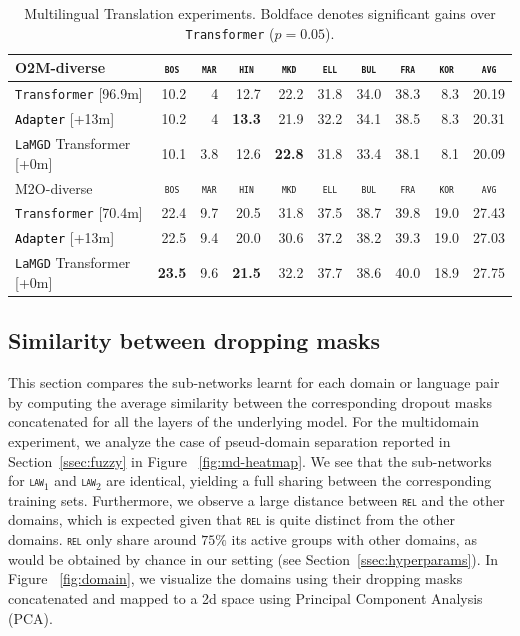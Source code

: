 \documentclass[11pt]{article}
\newcommand{\fyDone}[1]{\done[FY]\Todo[FY:]{\textcolor{orange}{#1}}}
\newcommand{\revision}[1]{\textcolor{black}{#1}}
\newcommand{\domain}[1]{\texttt{\textsc{#1}}}
\newcommand{\system}[1]{\texttt{{#1}}}
\newcommand{\SB}[1]{\textbf{#1}}
\begin{document}
\begin{table}[h!]
\begin{tabular}{|p{4cm}|*{9}{r|}}
    \hline
    \hline
    O2M-diverse & \multicolumn{1}{c|}{\domain{bos}} & \multicolumn{1}{c|}{\domain{mar}} & \multicolumn{1}{c|}{\domain{hin}} & \multicolumn{1}{c|}{\domain{mkd}} & \multicolumn{1}{c|}{\domain{ell}} & \multicolumn{1}{c|}{\domain{bul}} & \multicolumn{1}{c|}{\domain{fra}} & \multicolumn{1}{c|}{\domain{kor}} & \multicolumn{1}{c|}{\domain{avg}} \\ \hline 
    \system{Transformer}  \hfill{\footnotesize[96.9m]} & 10.2&4&12.7&22.2&31.8&34.0&38.3&8.3&20.19 \\
    \revision{\system{Adapter}}   \hfill{\footnotesize[+13m]}  &10.2&4&\SB{13.3}&21.9&32.2&34.1&38.5&8.3&20.31 \\ 
    \system{LaMGD} Transformer   \hfill{\footnotesize[+0m]}&10.1&3.8&12.6&\SB{22.8}&31.8&33.4&38.1&8.1&20.09\\
    \hline 
    \hline
    M2O-diverse & \multicolumn{1}{c|}{\domain{bos}} & \multicolumn{1}{c|}{\domain{mar}} & \multicolumn{1}{c|}{\domain{hin}} & \multicolumn{1}{c|}{\domain{mkd}} & \multicolumn{1}{c|}{\domain{ell}} & \multicolumn{1}{c|}{\domain{bul}} & \multicolumn{1}{c|}{\domain{fra}} & \multicolumn{1}{c|}{\domain{kor}} & \multicolumn{1}{c|}{\domain{avg}} \\ \hline 
    \system{Transformer}  \hfill{\footnotesize[70.4m]} &22.4&9.7&20.5&31.8&37.5&38.7&39.8&19.0&27.43 \\
    \revision{\system{Adapter}}   \hfill{\footnotesize[+13m]}  &22.5&9.4&20.0&30.6&37.2&38.2&39.3&19.0&27.03\\ 
    \system{LaMGD} Transformer  \hfill{\footnotesize[+0m]} &\SB{23.5}&9.6&\SB{21.5}&32.2&37.7&38.6&40.0&18.9&27.75 \\
    \hline
  \end{tabular}
  \caption{Multilingual Translation experiments. Boldface denotes significant gains over \system{Transformer} ($p=0.05$).\fyDone{What is the bold for ?}}
  \label{tab:multilingual}
\end{table}

\subsection{Similarity between dropping masks}
\label{ssec:abalation}
This section compares the sub-networks learnt for each domain or language pair by computing the average similarity between the corresponding dropout masks concatenated for all the layers of the underlying model. For the multidomain experiment, we analyze the case of pseud-domain separation reported in Section~\ref{ssec:fuzzy} in Figure ~\ref{fig:md-heatmap}. We see that the sub-networks for \domain{law$_1$} and \domain{law$_2$} are identical, yielding a full sharing between the corresponding training sets. Furthermore, we observe a large distance between \domain{rel} and the other domains, which is expected given that \domain{rel} is quite distinct from the other domains. \domain{rel} only share around $75 \%$ its active groups with other domains, as would be obtained by chance in our setting (see Section~\ref{ssec:hyperparams}). In Figure ~\ref{fig:domain}, we visualize the domains using their dropping masks concatenated and mapped to a 2d space using Principal Component Analysis (PCA).
\end{document}
